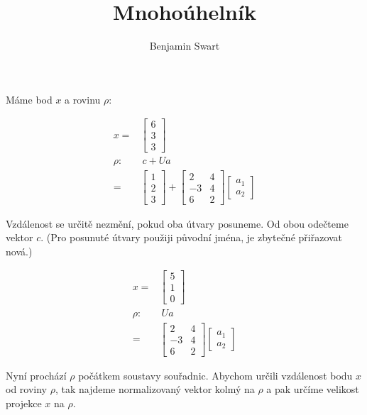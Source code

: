 \documentclass{article}
\title{Mnohoúhelník}
\author{Benjamin Swart}
\begin{document}
Máme bod $x$ a rovinu $\rho$:

\begin{align*}
    x =   & \begin{bmatrix}
                6 \\ 3 \\ 3
            \end{bmatrix} \\
    \rho: & \ c + U a      \\
    =     &
    \begin{bmatrix}
        1 \\ 2 \\ 3
    \end{bmatrix} +
    \begin{bmatrix}
        2  & 4 \\
        -3 & 4 \\
        6  & 2
    \end{bmatrix}
    \begin{bmatrix}
        a_1 \\
        a_2
    \end{bmatrix}
\end{align*}

Vzdálenost se určitě nezmění, pokud oba útvary posuneme. Od obou odečteme vektor $c$. (Pro posunuté útvary použiji původní jména, je zbytečné přiřazovat nová.)

\begin{align*}
    x =   & \begin{bmatrix}
                5 \\
                1 \\
                0
            \end{bmatrix} \\
    \rho: & \ U a          \\
    =     &
    \begin{bmatrix}
        2  & 4 \\
        -3 & 4 \\
        6  & 2
    \end{bmatrix}
    \begin{bmatrix}
        a_1 \\
        a_2
    \end{bmatrix}
\end{align*}

Nyní prochází $\rho$ počátkem soustavy souřadnic. Abychom určili vzdálenost bodu $x$ od roviny $\rho$, tak najdeme normalizovaný vektor kolmý na $\rho$ a pak určíme velikost projekce $x$ na $\rho$.
\end{document}

